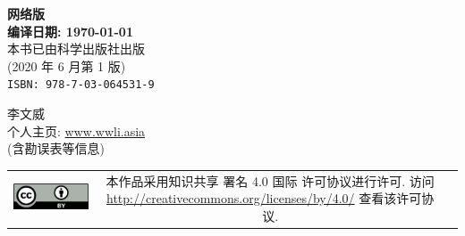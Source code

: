 \begin{titlepage}
\clearpage	%
\begin{center}
	\Large{\sffamily\bfseries\thmheiti 网络版} \\ \vspace{2em}
	\Large{\sffamily\bfseries\thmheiti 编译日期: \today} \\ \vspace{1em}
	本书已由科学出版社出版 \\
	(2020 年 6 月第 1 版) \\
	\texttt{ISBN: 978-7-03-064531-9}
\end{center}
\vfill


\begin{flushleft} \small
	李文威 \\
	个人主页: \href{https://www.wwli.asia}{www.wwli.asia} \\
	(含勘误表等信息)
\end{flushleft}
\vspace{1.5em}
\begin{tabular*}{\textwidth}{ccc}
	\includegraphics{ccby.png}
	& \begin{minipage}[b]{0.6\textwidth}
		\small\sffamily
		本作品采用知识共享 署名 4.0 国际 许可协议进行许可. 访问 \url{http://creativecommons.org/licenses/by/4.0/} 查看该许可协议.
	\end{minipage}
\end{tabular*}

\cleardoublepage
\end{titlepage}
